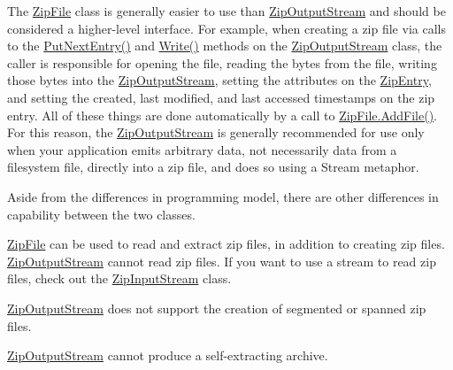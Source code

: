 The {\ttfamily \mbox{\hyperlink{class_super_tiled2_unity_1_1_ionic_1_1_zip_1_1_zip_file}{Zip\+File}}} class is generally easier to use than {\ttfamily \mbox{\hyperlink{class_super_tiled2_unity_1_1_ionic_1_1_zip_1_1_zip_output_stream}{Zip\+Output\+Stream}}} and should be considered a higher-\/level interface. For example, when creating a zip file via calls to the {\ttfamily \mbox{\hyperlink{class_super_tiled2_unity_1_1_ionic_1_1_zip_1_1_zip_output_stream_a6328a636a423976167278aca779a3eca}{Put\+Next\+Entry()}}} and {\ttfamily \mbox{\hyperlink{class_super_tiled2_unity_1_1_ionic_1_1_zip_1_1_zip_output_stream_a8cd95df92691b8f266216f1d6984dfec}{Write()}}} methods on the {\ttfamily \mbox{\hyperlink{class_super_tiled2_unity_1_1_ionic_1_1_zip_1_1_zip_output_stream}{Zip\+Output\+Stream}}} class, the caller is responsible for opening the file, reading the bytes from the file, writing those bytes into the {\ttfamily \mbox{\hyperlink{class_super_tiled2_unity_1_1_ionic_1_1_zip_1_1_zip_output_stream}{Zip\+Output\+Stream}}}, setting the attributes on the {\ttfamily \mbox{\hyperlink{class_super_tiled2_unity_1_1_ionic_1_1_zip_1_1_zip_entry}{Zip\+Entry}}}, and setting the created, last modified, and last accessed timestamps on the zip entry. All of these things are done automatically by a call to \mbox{\hyperlink{}{Zip\+File.\+Add\+File()}}. For this reason, the {\ttfamily \mbox{\hyperlink{class_super_tiled2_unity_1_1_ionic_1_1_zip_1_1_zip_output_stream}{Zip\+Output\+Stream}}} is generally recommended for use only when your application emits arbitrary data, not necessarily data from a filesystem file, directly into a zip file, and does so using a {\ttfamily Stream} metaphor. 

Aside from the differences in programming model, there are other differences in capability between the two classes. 


\begin{DoxyItemize}
\item {\ttfamily \mbox{\hyperlink{class_super_tiled2_unity_1_1_ionic_1_1_zip_1_1_zip_file}{Zip\+File}}} can be used to read and extract zip files, in addition to creating zip files. {\ttfamily \mbox{\hyperlink{class_super_tiled2_unity_1_1_ionic_1_1_zip_1_1_zip_output_stream}{Zip\+Output\+Stream}}} cannot read zip files. If you want to use a stream to read zip files, check out the \mbox{\hyperlink{class_super_tiled2_unity_1_1_ionic_1_1_zip_1_1_zip_input_stream}{Zip\+Input\+Stream}} class. 


\item {\ttfamily \mbox{\hyperlink{class_super_tiled2_unity_1_1_ionic_1_1_zip_1_1_zip_output_stream}{Zip\+Output\+Stream}}} does not support the creation of segmented or spanned zip files. 


\item {\ttfamily \mbox{\hyperlink{class_super_tiled2_unity_1_1_ionic_1_1_zip_1_1_zip_output_stream}{Zip\+Output\+Stream}}} cannot produce a self-\/extracting archive.  
\end{DoxyItemize}

